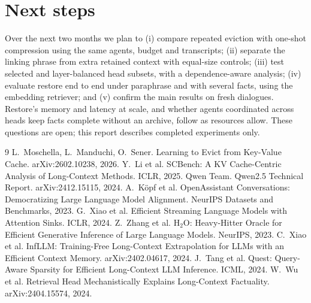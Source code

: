 \documentclass[11pt,a4paper]{article}
\begin{document}
\section{Next steps}
Over the next two months we plan to (i) compare repeated eviction with one-shot compression using the same agents, budget and transcripts; (ii) separate the linking phrase from extra retained context with equal-size controls; (iii) test selected and layer-balanced head subsets, with a dependence-aware analysis; (iv) evaluate restore end to end under paraphrase and with several facts, using the embedding retriever; and (v) confirm the main results on fresh dialogues. Restore's memory and latency at scale, and whether agents coordinated across heads keep facts complete without an archive, follow as resources allow. These questions are open; this report describes completed experiments only.

\begin{thebibliography}{9}\small\setlength{\itemsep}{0pt}
 L.~Moschella, L.~Manduchi, O.~Sener. Learning to Evict from Key-Value Cache. arXiv:2602.10238, 2026.
 Y.~Li et al. SCBench: A KV Cache-Centric Analysis of Long-Context Methods. ICLR, 2025.
 Qwen Team. Qwen2.5 Technical Report. arXiv:2412.15115, 2024.
 A.~Köpf et al. OpenAssistant Conversations: Democratizing Large Language Model Alignment. NeurIPS Datasets and Benchmarks, 2023.
 G.~Xiao et al. Efficient Streaming Language Models with Attention Sinks. ICLR, 2024.
 Z.~Zhang et al. H$_2$O: Heavy-Hitter Oracle for Efficient Generative Inference of Large Language Models. NeurIPS, 2023.
 C.~Xiao et al. InfLLM: Training-Free Long-Context Extrapolation for LLMs with an Efficient Context Memory. arXiv:2402.04617, 2024.
 J.~Tang et al. Quest: Query-Aware Sparsity for Efficient Long-Context LLM Inference. ICML, 2024.
 W.~Wu et al. Retrieval Head Mechanistically Explains Long-Context Factuality. arXiv:2404.15574, 2024.
\end{thebibliography}
\end{document}
